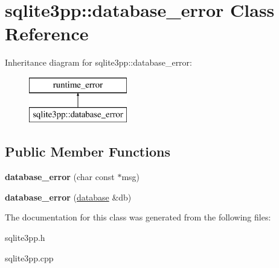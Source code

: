 \hypertarget{classsqlite3pp_1_1database__error}{\section{sqlite3pp\-:\-:database\-\_\-error Class Reference}
\label{classsqlite3pp_1_1database__error}
}
Inheritance diagram for sqlite3pp\-:\-:database\-\_\-error\-:\begin{figure}[H]
\begin{center}
\leavevmode
\includegraphics[height=2.000000cm]{classsqlite3pp_1_1database__error}
\end{center}
\end{figure}
\subsection*{Public Member Functions}
\begin{DoxyCompactItemize}
\item 
\hypertarget{classsqlite3pp_1_1database__error_a38aeb58dbf02b6f668c6df08a1932b1a}{{\bfseries database\-\_\-error} (char const $\ast$msg)}\label{classsqlite3pp_1_1database__error_a38aeb58dbf02b6f668c6df08a1932b1a}

\item 
\hypertarget{classsqlite3pp_1_1database__error_a03789ebe1ee0fdecb8e50ba728b650e8}{{\bfseries database\-\_\-error} (\hyperlink{classsqlite3pp_1_1database}{database} \&db)}\label{classsqlite3pp_1_1database__error_a03789ebe1ee0fdecb8e50ba728b650e8}

\end{DoxyCompactItemize}


The documentation for this class was generated from the following files\-:\begin{DoxyCompactItemize}
\item 
sqlite3pp.\-h\item 
sqlite3pp.\-cpp\end{DoxyCompactItemize}
